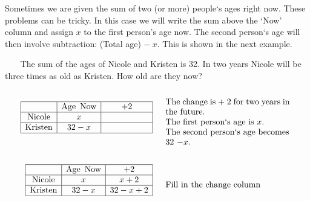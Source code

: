  Sometimes we are given the sum of two (or more) people`s ages right now. These problems can be tricky. In this case we will write the sum above the `Now' column and assign $x$ to the first person's age now. The second person`s age will then involve subtraction: (Total age) $-~x$. This is shown in the next example.

\begin{example}\label{Lin84}~~~ The sum of the ages of Nicole and Kristen is 32. In two years Nicole will be three times as old as Kristen. How old are they now?
  \begin{eqnarray*}
      \begin{array}{|c|c|c|}
        \hline
        & \tmop{Age~} \tmop{Now} & + 2\\
        \hline
        \tmop{Nicole} & x & \mbox{\hspace{.7in}}\\
        \hline
        \tmop{Kristen} & 32 - x & \\
        \hline
      \end{array}
	&  & \begin{array}{p{0.425\textwidth}}
      \\
      \tmop{The} \tmop{change} \tmop{is} + 2 \tmop{for} \tmop{two}
      \tmop{years} \tmop{in} \tmop{the} \tmop{future}.\\
      \tmop{The} \tmop{first} \tmop{person`s~age} \tmop{is} $x$.\\
			\tmop{The~second~person`s~age~becomes} 32 $- x$.
    \end{array}\\
    &  & \\
    \begin{array}{|c|c|c|}
      \hline
      & \tmop{Age~} \tmop{Now} & + 2\\
      \hline
      \tmop{Nicole} & x & x + 2\\
      \hline
      \tmop{Kristen} & 32 - x & 32 - x + 2\\
      \hline
    \end{array} &  & \begin{array}{p{0.425\textwidth}}
		\\
		\tmop{Fill~in~the~change~column}\\

\end{array}
\end{eqnarray*}
\end{example}
